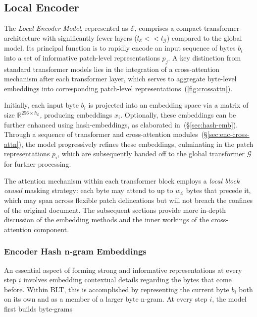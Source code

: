 \subsection{Local Encoder}
\label{section:local}

The \textit{Local Encoder Model}, represented as $\mathcal{E}$, comprises a compact transformer architecture with significantly fewer layers ($l_{\mathcal{E}} << l_{\mathcal{G}}$) compared to the global model. Its principal function is to rapidly encode an input sequence of bytes $b_i$ into a set of informative patch-level representations $p_j$. A key distinction from standard transformer models lies in the integration of a cross-attention mechanism after each transformer layer, which serves to aggregate byte-level embeddings into corresponding patch-level representations~(\autoref{fig:crossattn}).

Initially, each input byte $b_i$ is projected into an embedding space via a matrix of size $\mathbb{R}^{256 \times h_{\mathcal{E}}}$, producing embeddings $x_i$. Optionally, these embeddings can be further enhanced using hash-embeddings, as elaborated in~(\S\ref{sec:hash-emb}). Through a sequence of transformer and cross-attention modules~(\S\ref{sec:enc-cross-attn}), the model progressively refines these embeddings, culminating in the patch representations $p_i$, which are subsequently handed off to the global transformer $\mathcal{G}$ for further processing.

The attention mechanism within each transformer block employs a \textit{local block causal} masking strategy: each byte may attend to up to $w_{\mathcal{E}}$ bytes that precede it, which may span across flexible patch delineations but will not breach the confines of the original document. The subsequent sections provide more in-depth discussion of the embedding methods and the inner workings of the cross-attention component.

\subsubsection{Encoder Hash n-gram Embeddings}
\label{sec:ngram-emb}
\label{sec:hash-emb}
An essential aspect of forming strong and informative representations at every step $i$ involves embedding contextual details regarding the bytes that come before. Within {\textsc BLT}, this is accomplished by representing the current byte $b_i$ both on its own and as a member of a larger byte n-gram. At every step $i$, the model first builds byte-grams

